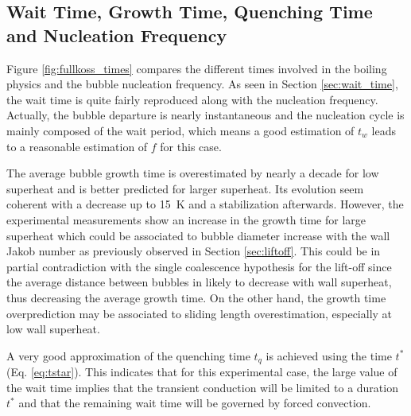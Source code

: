 \subsection{Wait Time, Growth Time, Quenching Time and Nucleation Frequency}

Figure \ref{fig:fullkoss_times} compares the different times involved in the boiling physics and the bubble nucleation frequency. As seen in Section \ref{sec:wait_time}, the wait time is quite fairly reproduced along with the nucleation frequency. Actually, the bubble departure is nearly instantaneous and the nucleation cycle is mainly composed of the wait period, which means a good estimation of $t_{w}$ leads to a reasonable estimation of $f$ for this case.

\npar

The average bubble growth time is overestimated by nearly a decade for low superheat and is better predicted for larger superheat. Its evolution seem coherent with a decrease up to 15\ K and a stabilization afterwards. However, the experimental measurements show an increase in the growth time for large superheat which could be associated to bubble diameter increase with the wall Jakob number as previously observed in Section \ref{sec:liftoff}. This could be in partial contradiction with the single coalescence hypothesis for the lift-off since the average distance between bubbles in likely to decrease with wall superheat, thus decreasing the average growth time. On the other hand, the growth time overprediction may be associated to sliding length overestimation, especially at low wall superheat.

\npar

A very good approximation of the quenching time $t_{q}$ is achieved using the time $t^{*}$ (Eq. \ref{eq:tstar}). This indicates that for this experimental case, the large value of the wait time implies that the transient conduction will be limited to a duration $t^{*}$ and that the remaining wait time will be governed by forced convection. 

